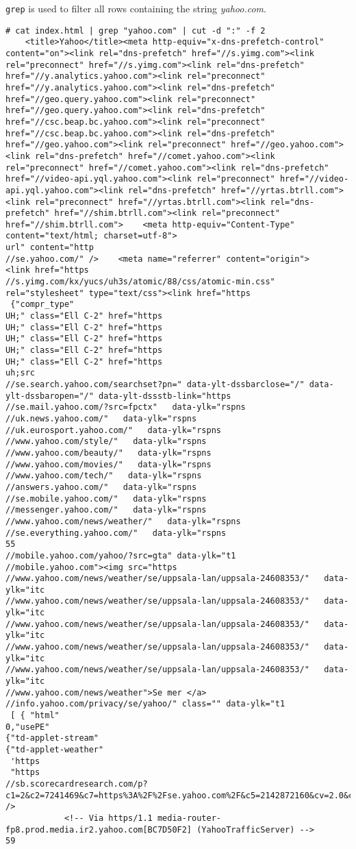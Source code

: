 \pagebreak
\texttt{grep} is used to filter all rows containing the string \textit{yahoo.com}.

\begin{lstlisting}[numbers=none, language={}, frame=single, framexleftmargin={0.2em}]
# cat index.html | grep "yahoo.com" | cut -d ":" -f 2
    <title>Yahoo</title><meta http-equiv="x-dns-prefetch-control" content="on"><link rel="dns-prefetch" href="//s.yimg.com"><link rel="preconnect" href="//s.yimg.com"><link rel="dns-prefetch" href="//y.analytics.yahoo.com"><link rel="preconnect" href="//y.analytics.yahoo.com"><link rel="dns-prefetch" href="//geo.query.yahoo.com"><link rel="preconnect" href="//geo.query.yahoo.com"><link rel="dns-prefetch" href="//csc.beap.bc.yahoo.com"><link rel="preconnect" href="//csc.beap.bc.yahoo.com"><link rel="dns-prefetch" href="//geo.yahoo.com"><link rel="preconnect" href="//geo.yahoo.com"><link rel="dns-prefetch" href="//comet.yahoo.com"><link rel="preconnect" href="//comet.yahoo.com"><link rel="dns-prefetch" href="//video-api.yql.yahoo.com"><link rel="preconnect" href="//video-api.yql.yahoo.com"><link rel="dns-prefetch" href="//yrtas.btrll.com"><link rel="preconnect" href="//yrtas.btrll.com"><link rel="dns-prefetch" href="//shim.btrll.com"><link rel="preconnect" href="//shim.btrll.com">    <meta http-equiv="Content-Type" content="text/html; charset=utf-8">
url" content="http
//se.yahoo.com/" />    <meta name="referrer" content="origin">        <link href="https
//s.yimg.com/kx/yucs/uh3s/atomic/88/css/atomic-min.css" rel="stylesheet" type="text/css"><link href="https
 {"compr_type"
UH;" class="Ell C-2" href="https
UH;" class="Ell C-2" href="https
UH;" class="Ell C-2" href="https
UH;" class="Ell C-2" href="https
UH;" class="Ell C-2" href="https
uh;src
//se.search.yahoo.com/searchset?pn=" data-ylt-dssbarclose="/" data-ylt-dssbaropen="/" data-ylt-dssstb-link="https
//se.mail.yahoo.com/?src=fpctx"   data-ylk="rspns
//uk.news.yahoo.com/"   data-ylk="rspns
//uk.eurosport.yahoo.com/"   data-ylk="rspns
//www.yahoo.com/style/"   data-ylk="rspns
//www.yahoo.com/beauty/"   data-ylk="rspns
//www.yahoo.com/movies/"   data-ylk="rspns
//www.yahoo.com/tech/"   data-ylk="rspns
//answers.yahoo.com/"   data-ylk="rspns
//se.mobile.yahoo.com/"   data-ylk="rspns
//messenger.yahoo.com/"   data-ylk="rspns
//www.yahoo.com/news/weather/"   data-ylk="rspns
//se.everything.yahoo.com/"   data-ylk="rspns
55
//mobile.yahoo.com/yahoo/?src=gta" data-ylk="t1
//mobile.yahoo.com"><img src="https
//www.yahoo.com/news/weather/se/uppsala-lan/uppsala-24608353/"   data-ylk="itc
//www.yahoo.com/news/weather/se/uppsala-lan/uppsala-24608353/"   data-ylk="itc
//www.yahoo.com/news/weather/se/uppsala-lan/uppsala-24608353/"   data-ylk="itc
//www.yahoo.com/news/weather/se/uppsala-lan/uppsala-24608353/"   data-ylk="itc
//www.yahoo.com/news/weather/se/uppsala-lan/uppsala-24608353/"   data-ylk="itc
//www.yahoo.com/news/weather">Se mer </a>
//info.yahoo.com/privacy/se/yahoo/" class="" data-ylk="t1
 [ { "html"
0,"usePE"
{"td-applet-stream"
{"td-applet-weather"
 'https
 "https
//sb.scorecardresearch.com/p?c1=2&c2=7241469&c7=https%3A%2F%2Fse.yahoo.com%2F&c5=2142872160&cv=2.0&cj=1" />
            <!-- Via https/1.1 media-router-fp8.prod.media.ir2.yahoo.com[BC7D50F2] (YahooTrafficServer) -->
59
\end{lstlisting}

